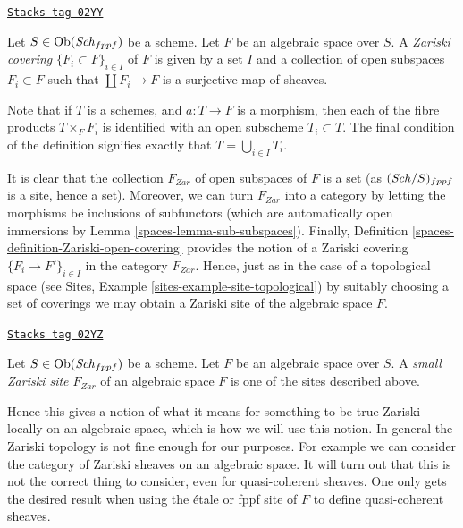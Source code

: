 \begin{definition}
\label{spaces-definition-Zariski-open-covering}
\href{https://stacks.math.columbia.edu/tag/02YY}{\texttt{Stacks tag 02YY}}

Let $S \in \operatorname{Ob}(\mathit{Sch}_{fppf})$ be a scheme.
Let $F$ be an algebraic space over $S$.
A {\it Zariski covering} $\{F_i \subset F\}_{i \in I}$ of $F$
is given by a set $I$ and a collection of open subspaces
$F_i \subset F$ such that $\coprod F_i \to F$ is a surjective
map of sheaves.
\end{definition}

Note that if $T$ is a schemes,
and $a : T \to F$ is a morphism, then each of the fibre products
$T \times_F F_i$ is identified with an open subscheme
$T_i \subset T$. The final condition of the definition signifies
exactly that $T = \bigcup_{i \in I} T_i$.

\medskip\noindent
It is clear that the collection $F_{Zar}$ of open subspaces of
$F$ is a set (as $(\mathit{Sch}/S)_{fppf}$ is a site, hence a set).
Moreover, we can turn $F_{Zar}$ into a category by letting the
morphisms be inclusions of subfunctors (which are automatically open
immersions by Lemma \ref{spaces-lemma-sub-subspaces}). Finally,
Definition \ref{spaces-definition-Zariski-open-covering}
provides the notion of a Zariski covering $\{F_i \to F'\}_{i \in I}$
in the category $F_{Zar}$. Hence, just as in the case of a topological
space (see Sites, Example \ref{sites-example-site-topological})
by suitably choosing a set of coverings
we may obtain a Zariski site of the algebraic space $F$.

\begin{definition}
\label{spaces-definition-small-Zariski-site}
\href{https://stacks.math.columbia.edu/tag/02YZ}{\texttt{Stacks tag 02YZ}}

Let $S \in \operatorname{Ob}(\mathit{Sch}_{fppf})$ be a scheme. Let $F$ be an algebraic space over
$S$. A {\it small Zariski site $F_{Zar}$} of an algebraic space $F$ is one
of the sites described above.
\end{definition}

Hence this gives a notion of what it means for something to be true
Zariski locally on an algebraic space, which is how we will use this
notion. In general the Zariski topology is not fine enough for our
purposes. For example we can consider the category of Zariski sheaves
on an algebraic space. It will turn out that this is not the
correct thing to consider, even for quasi-coherent sheaves.
One only gets the desired result when using the \'etale or fppf site of
$F$ to define quasi-coherent sheaves.

